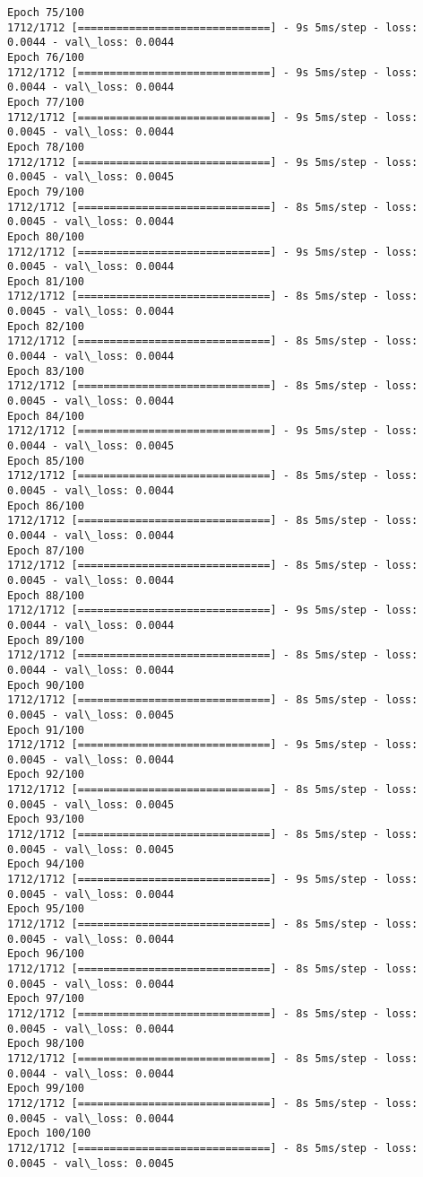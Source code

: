 \documentclass[11pt]{article}
\begin{document}
\begin{Verbatim}[commandchars=\\\{\}]
Epoch 75/100
1712/1712 [==============================] - 9s 5ms/step - loss: 0.0044 - val\_loss: 0.0044
Epoch 76/100
1712/1712 [==============================] - 9s 5ms/step - loss: 0.0044 - val\_loss: 0.0044
Epoch 77/100
1712/1712 [==============================] - 9s 5ms/step - loss: 0.0045 - val\_loss: 0.0044
Epoch 78/100
1712/1712 [==============================] - 9s 5ms/step - loss: 0.0045 - val\_loss: 0.0045
Epoch 79/100
1712/1712 [==============================] - 8s 5ms/step - loss: 0.0045 - val\_loss: 0.0044
Epoch 80/100
1712/1712 [==============================] - 9s 5ms/step - loss: 0.0045 - val\_loss: 0.0044
Epoch 81/100
1712/1712 [==============================] - 8s 5ms/step - loss: 0.0045 - val\_loss: 0.0044
Epoch 82/100
1712/1712 [==============================] - 8s 5ms/step - loss: 0.0044 - val\_loss: 0.0044
Epoch 83/100
1712/1712 [==============================] - 8s 5ms/step - loss: 0.0045 - val\_loss: 0.0044
Epoch 84/100
1712/1712 [==============================] - 9s 5ms/step - loss: 0.0044 - val\_loss: 0.0045
Epoch 85/100
1712/1712 [==============================] - 8s 5ms/step - loss: 0.0045 - val\_loss: 0.0044
Epoch 86/100
1712/1712 [==============================] - 8s 5ms/step - loss: 0.0044 - val\_loss: 0.0044
Epoch 87/100
1712/1712 [==============================] - 8s 5ms/step - loss: 0.0045 - val\_loss: 0.0044
Epoch 88/100
1712/1712 [==============================] - 9s 5ms/step - loss: 0.0044 - val\_loss: 0.0044
Epoch 89/100
1712/1712 [==============================] - 8s 5ms/step - loss: 0.0044 - val\_loss: 0.0044
Epoch 90/100
1712/1712 [==============================] - 8s 5ms/step - loss: 0.0045 - val\_loss: 0.0045
Epoch 91/100
1712/1712 [==============================] - 9s 5ms/step - loss: 0.0045 - val\_loss: 0.0044
Epoch 92/100
1712/1712 [==============================] - 8s 5ms/step - loss: 0.0045 - val\_loss: 0.0045
Epoch 93/100
1712/1712 [==============================] - 8s 5ms/step - loss: 0.0045 - val\_loss: 0.0045
Epoch 94/100
1712/1712 [==============================] - 9s 5ms/step - loss: 0.0045 - val\_loss: 0.0044
Epoch 95/100
1712/1712 [==============================] - 8s 5ms/step - loss: 0.0045 - val\_loss: 0.0044
Epoch 96/100
1712/1712 [==============================] - 8s 5ms/step - loss: 0.0045 - val\_loss: 0.0044
Epoch 97/100
1712/1712 [==============================] - 8s 5ms/step - loss: 0.0045 - val\_loss: 0.0044
Epoch 98/100
1712/1712 [==============================] - 8s 5ms/step - loss: 0.0044 - val\_loss: 0.0044
Epoch 99/100
1712/1712 [==============================] - 8s 5ms/step - loss: 0.0045 - val\_loss: 0.0044
Epoch 100/100
1712/1712 [==============================] - 8s 5ms/step - loss: 0.0045 - val\_loss: 0.0045

    \end{Verbatim}
\end{document}
